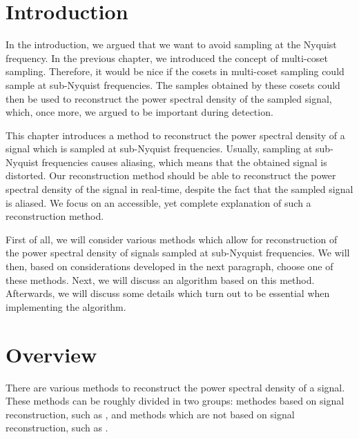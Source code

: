 \documentclass[a4paper, openany, oneside]{memoir}
\begin{document}

\section{Introduction}
In the introduction, we argued that we want to avoid sampling at the Nyquist frequency. In the previous chapter, we introduced the concept of multi-coset sampling. Therefore, it would be nice if the cosets in multi-coset sampling could sample at sub-Nyquist frequencies. The samples obtained by these cosets could then be used to reconstruct the power spectral density of the sampled signal, which, once more, we argued to be important during detection.

This chapter introduces a method to reconstruct the power spectral density of a signal which is sampled at sub-Nyquist frequencies. Usually, sampling at sub-Nyquist frequencies causes aliasing, which means that the obtained signal is distorted. Our reconstruction method should be able to reconstruct the power spectral density of the signal in real-time, despite the fact that the sampled signal is aliased. We focus on an accessible, yet complete explanation of such a reconstruction method.

First of all, we will consider various methods which allow for reconstruction of the power spectral density of signals sampled at sub-Nyquist frequencies. We will then, based on considerations developed in the next paragraph, choose one of these methods. Next, we will discuss an algorithm based on this method. Afterwards, we will discuss some details which turn out to be essential when implementing the algorithm.


\section{Overview}
There are various methods to reconstruct the power spectral density of a signal. These methods can be roughly divided in two groups: methodes based on signal reconstruction, such as \cite{bayarkernel, candes2006robust, candes2007sparsity, candes2008introduction, kirolos2006analog, li2014gomp, polo2009compressive, pal2011coprime}, and methods which are not based on signal reconstruction, such as \cite{ariananda2011multicoset,ariananda2012compressive}.
\end{document}
